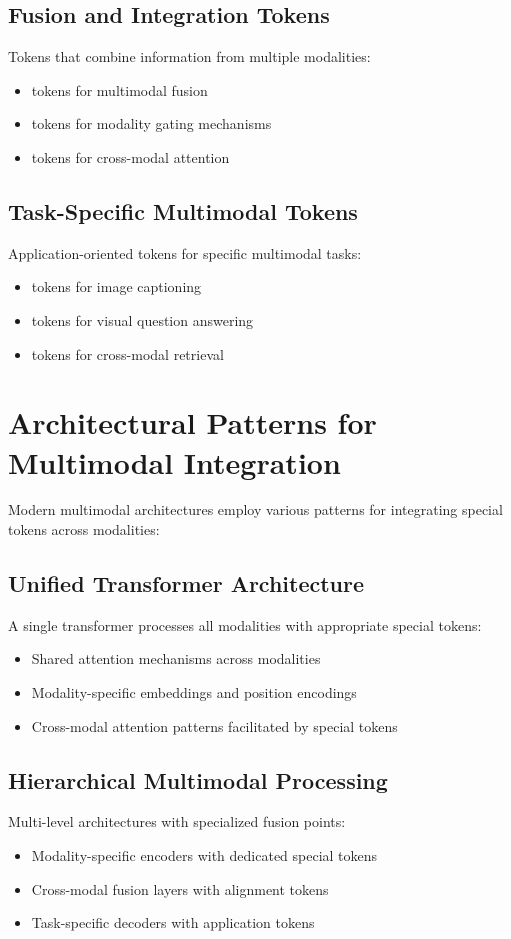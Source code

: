\subsection{Fusion and Integration Tokens}
Tokens that combine information from multiple modalities:
\begin{itemize}
\item {} tokens for multimodal fusion
\item {} tokens for modality gating mechanisms
\item {} tokens for cross-modal attention
\end{itemize}

\subsection{Task-Specific Multimodal Tokens}
Application-oriented tokens for specific multimodal tasks:
\begin{itemize}
\item {} tokens for image captioning
\item {} tokens for visual question answering
\item {} tokens for cross-modal retrieval
\end{itemize}

\section{Architectural Patterns for Multimodal Integration}

Modern multimodal architectures employ various patterns for integrating special tokens across modalities:

\subsection{Unified Transformer Architecture}
A single transformer processes all modalities with appropriate special tokens:
\begin{itemize}
\item Shared attention mechanisms across modalities
\item Modality-specific embeddings and position encodings
\item Cross-modal attention patterns facilitated by special tokens
\end{itemize}

\subsection{Hierarchical Multimodal Processing}
Multi-level architectures with specialized fusion points:
\begin{itemize}
\item Modality-specific encoders with dedicated special tokens
\item Cross-modal fusion layers with alignment tokens
\item Task-specific decoders with application tokens
\end{itemize}

